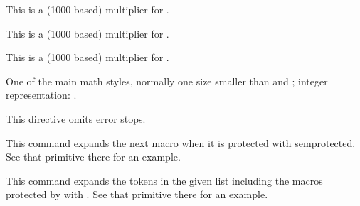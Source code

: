 This is a (1000 based) multiplier for .

\stopnewprimitive

\startnewprimitive[title={\prm {scriptspacebeforefactor}}]

This is a (1000 based) multiplier for .

\stopnewprimitive

\startnewprimitive[title={\prm {scriptspacebetweenfactor}}]

This is a (1000 based) multiplier for .

\stopnewprimitive

\startoldprimitive[title={\prm {scriptstyle}}]

One of the main math styles, normally one size smaller than 
and ; integer representation: \the\scriptstyle.

\stopoldprimitive

\startoldprimitive[title={\prm {scrollmode}}]

    This directive omits error stops.

\stopoldprimitive

\startnewprimitive[title={\prm {semiexpand}}]

This command expands the next macro when it is protected with \prm
{semprotected}. See that primitive there for an example.

\stopnewprimitive

\startnewprimitive[title={\prm {semiexpanded}}]

This command expands the tokens in the given list including the macros protected
by with . See that primitive there for an example.

\stopnewprimitive

\startnewprimitive[title={\prm {semiprotected}}]

%
%

\startbuffer
              \def\TestA{A}
\semiprotected{}
    \protected{}

\edef\TestD{\TestA           \TestB           \TestC}
\edef\TestE{\TestA\semiexpand\TestB\semiexpand\TestC}
\edef\TestF{\TestA\expand    \TestB\expand    \TestC}

